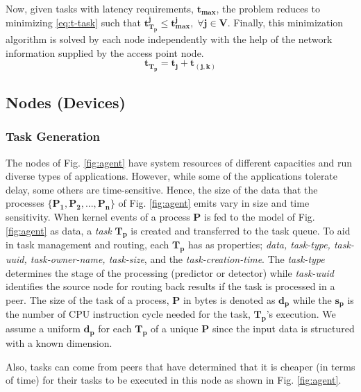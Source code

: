 Now, given tasks with latency requirements, $ \bm{t_{max}} $, 
the problem reduces to minimizing \eqref{eq:t-task} such that 
${ \bm{t_{T_p}^j\leq t_{max}^j, \; \forall j \in V }} $. 
Finally, this minimization algorithm is solved by each 
node independently with the help of the network information 
supplied by the access point node.
\begin{equation}
\bm{t_{T_p} = t_{j} + t_{(j,k)} } 
\label{eq:t-task}
\end{equation}
\subsection{Nodes (Devices)}
\subsubsection{Task Generation}
\label{subsec:task-generation}
The nodes of Fig. \ref{fig:agent} have 
system resources of different capacities and run diverse 
types of applications. However, while some of the 
applications tolerate delay, some others are time-sensitive. 
Hence, the size of the data that the processes $ 
\bm{\{P_1,P_2,...,P_n\}} $ of 
Fig. \ref{fig:agent} emits vary in size and time sensitivity. 
When kernel events of a process $ \bm{P} $ is fed to the 
model of Fig. \ref{fig:agent} as data, a \emph{task} $ 
\bm{T_{p}} $ is created and transferred to the task queue. To 
aid in task management and routing, each $ \bm{T_p} $ has as 
properties; \emph{data, task-type, task-uuid, 
	task-owner-name, task-size}, and the 
\emph{task-creation-time}. The 
\emph{task-type} determines the stage of the processing 
(predictor or detector) while \emph{task-uuid} identifies the 
source node for routing back results if the task is 
processed in a peer. The size of the task of a process, $ 
\bm{P} $ in bytes is denoted 
as $ \bm{d_p} $ while the $ \bm{s_{p}} $ is the number of CPU 
instruction 
cycle 
needed for the task, $ \bm{T_p} $'s execution. We assume a 
uniform $ 
\bm{d_p} $ for each $ \bm{T_p} $ of a unique $ \bm{P} $ since 
the input data is structured with a known dimension.
\par
Also, tasks can come from peers that have determined that it 
is cheaper (in terms of time) for their tasks to be executed 
in this node as shown in Fig. \ref{fig:agent}.  
